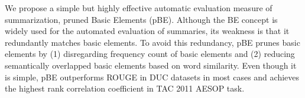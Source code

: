 We propose a simple but highly effective automatic evaluation measure of summarization, pruned Basic Elements (pBE). Although the BE concept is widely used for the automated evaluation of summaries, its weakness is that it redundantly matches basic elements. To avoid this redundancy, pBE prunes basic elements by (1) disregarding frequency count of basic elements and (2) reducing semantically overlapped basic elements based on word similarity. Even though it is simple, pBE outperforms ROUGE in DUC datasets in most cases and achieves the highest rank correlation coefficient in TAC 2011 AESOP task.
